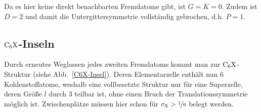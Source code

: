 \documentclass[a4paper, 10pt, twoside, openany]{book} %
\def \cX {c_\mathrm{X}}
\begin{document}
Da es hier keine direkt benachbarten Fremdatome gibt, ist $G = K = 0$. Zudem ist $D = 2$ und damit die Untergittersymmetrie vollständig gebrochen, d.h. $P = 1$.

\subsection{$\rm C_6X$-Inseln}

Durch erneutes Weglassen jedes zweiten Fremdatoms kommt man zur $\rm C_6X$-Struktur (siehe Abb.~\ref{C6X-Insel}). Deren Elementarzelle enthält nun 6 Kohlenstoffatome, weshalb eine vollbesetzte Struktur nur für eine Superzelle, deren Größe $l$ durch 3 teilbar ist, ohne einen Bruch der Translationssymmetrie möglich ist. Zwischenplätze müssen hier schon für $\cX > \nicefrac 1 6$ belegt werden.
\end{document}
